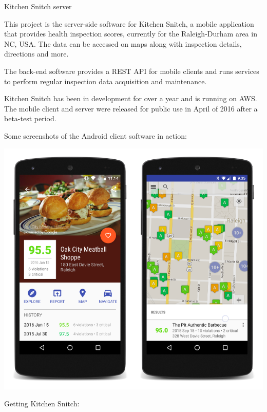 \documentclass[DIV16,twocolumn,10pt]{scrreprt}
\begin{document}
\begin{hcarentry}{Kitchen Snitch server}
\makeheader

This project is the server-side software for Kitchen Snitch, a mobile application that provides health inspection scores, currently for the Raleigh-Durham area in NC, USA. The data can be accessed on maps along with inspection details, directions and more.

\vspace{5mm}

The back-end software provides a REST API for mobile clients and runs services to perform regular inspection data acquisition and maintenance.

\vspace{5mm}

Kitchen Snitch has been in development for over a year and is running on AWS. The mobile client and server were released for public use in April of 2016 after a beta-test period.

\vspace{5mm}

Some screenshots of the Android client software in action:

\includegraphics{ks_screenshots}

Getting Kitchen Snitch:

\vspace{5mm}


\end{hcarentry}
\end{document}

